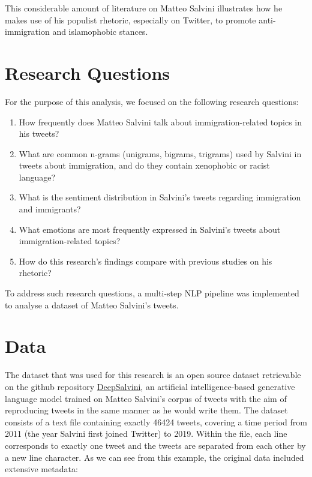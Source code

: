 \documentclass[11pt]{article}
\begin{document}
This considerable amount of literature on Matteo Salvini illustrates how he makes use of his populist rhetoric, especially on Twitter, to promote anti-immigration and islamophobic stances.


\section{Research Questions}

For the purpose of this analysis, we focused on the following research questions:
\begin{enumerate}[label=\textbullet, align=left, leftmargin=*]
    \item How frequently does Matteo Salvini talk about immigration-related topics in his tweets?
    \item What are common n-grams (unigrams, bigrams, trigrams) used by Salvini in tweets about immigration, and do they contain xenophobic or racist language?
    \item What is the sentiment distribution in Salvini's tweets regarding immigration and immigrants?
    \item What emotions are most frequently expressed in Salvini's tweets about immigration-related topics?
    \item How do this research’s findings compare with previous studies on his rhetoric?
\end{enumerate}
To address such research questions, a multi-step NLP pipeline was implemented to analyse a dataset of Matteo Salvini's tweets.




\section{Data}

The dataset that was used for this research is an open source dataset retrievable on the github repository \href{https://github.com/galatolofederico/deep-salvini}{DeepSalvini}, an artificial intelligence-based generative language model trained on Matteo Salvini's corpus of tweets with the aim of reproducing tweets in the same manner as he would write them. The dataset consists of a text file containing exactly 46424 tweets, covering a time period from 2011 (the year Salvini first joined Twitter) to 2019. Within the file, each line corresponds to exactly one tweet and the tweets are separated from each other by a new line character. As we can see from this example, the original data included extensive metadata:
\end{document}
